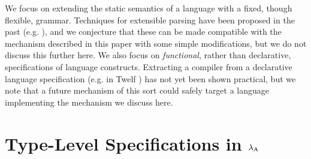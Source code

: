 \documentclass[10pt]{sigplanconf}
\begin{document}
We focus on extending the static semantics of a language with a fixed, though flexible, grammar. Techniques for extensible parsing have been proposed in the past (e.g. \cite{journals/entcs/BrabrandSV03}), and we conjecture that these can be made compatible with the mechanism described in this paper with some simple modifications, but we do not discuss this further here. We also focus on {\it functional}, rather than declarative, specifications of language constructs. Extracting a compiler from a declarative language specification (e.g. in Twelf \cite{twelf}) has not yet been shown practical, but we note that a future mechanism of this sort could safely target a language implementing the mechanism we discuss here.

\section{Type-Level Specifications in $\lambda_{\text{A}}$}
\end{document}
